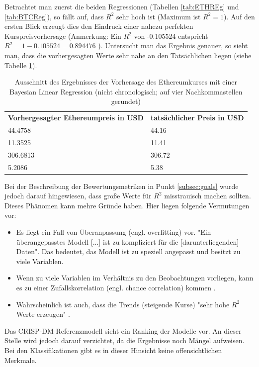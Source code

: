 Betrachtet man zuerst die beiden Regressionen (Tabellen \ref{tab:ETHREg} und \ref{tab:BTCReg}), so fällt auf, dass $ R^2 $ sehr hoch ist (Maximum ist $ R^2 = 1 $). Auf den ersten Blick erzeugt dies den Eindruck einer nahezu perfekten Kurspreisvorhersage (Anmerkung: Ein $ R^2 $ von -0.105524 entspricht  $ R^2 = 1 - 0.105524 = 0.894476 $ ). Untersucht man das Ergebnis genauer, so sieht man, dass die vorhergesagten Werte sehr nahe an den Tatsächlichen liegen (siehe Tabelle \ref{tab:scoredReal}).
\begin{table}[H]
\centering
\begin{tabular}{|p{4cm}|p{4cm}|}
\hline
\textbf{Vorhergesagter Ethereumpreis in USD} & \textbf{tatsächlicher Preis in USD}\\ 
\hhline{==}
44.4758 & 44.16 \\ \hline
11.3525 & 11.41 \\ \hline
306.6813 & 306.72 \\ \hline
5.2086 & 5.38 \\ \hline
\end{tabular}
\caption{Ausschnitt des Ergebnisses der Vorhersage des Ethereumkurses mit einer Bayesian Linear Regression (nicht chronologisch; auf vier Nachkommastellen gerundet)}
\label{tab:scoredReal}
\end{table}
Bei der Beschreibung der Bewertungsmetriken in Punkt \ref{subsec:goals} wurde jedoch darauf hingewiesen, dass große Werte für $ R^2 $ misstrauisch machen sollten. Dieses Phänomen kann mehre Gründe haben. Hier liegen folgende Vermutungen vor:
\begin{itemize}
\item Es liegt ein Fall von Überanpassung (engl. overfitting) vor. "Ein überangepasstes Modell [...] ist zu kompliziert für die [darunterliegenden] Daten"\citep[eigene Übersetzung]{frost_danger_2015}. Das bedeutet, das Modell ist zu speziell angepasst und besitzt zu viele Variablen.
\item Wenn zu viele Variablen im Verhältnis zu den Beobachtungen vorliegen, kann es zu einer Zufallskorrelation (engl. chance correlation) kommen \citep{lohninger_teach/me_1999}.
\item Wahrscheinlich ist auch, dass die Trends (steigende Kurse) "sehr hohe $ R^2 $ Werte erzeugen" \citep[eigene Übersetzung]{frost_five_2016}.
\end{itemize}
Das CRISP-DM Referenzmodell sieht ein Ranking der Modelle vor. An dieser Stelle wird jedoch darauf verzichtet, da die Ergebnisse noch Mängel aufweisen.
Bei den Klassifikationen gibt es in dieser Hinsicht keine offensichtlichen Merkmale.\par 
